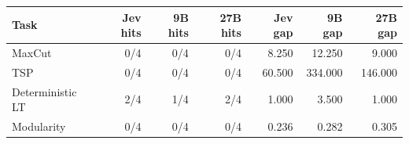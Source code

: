 \begin{tabular}{lrrrrrr}
\toprule
Task & Jev hits & 9B hits & 27B hits & Jev gap & 9B gap & 27B gap \\
\midrule
MaxCut & 0/4 & 0/4 & 0/4 & 8.250 & 12.250 & 9.000 \\
TSP & 0/4 & 0/4 & 0/4 & 60.500 & 334.000 & 146.000 \\
Deterministic LT & 2/4 & 1/4 & 2/4 & 1.000 & 3.500 & 1.000 \\
Modularity & 0/4 & 0/4 & 0/4 & 0.236 & 0.282 & 0.305 \\
\bottomrule
\end{tabular}
